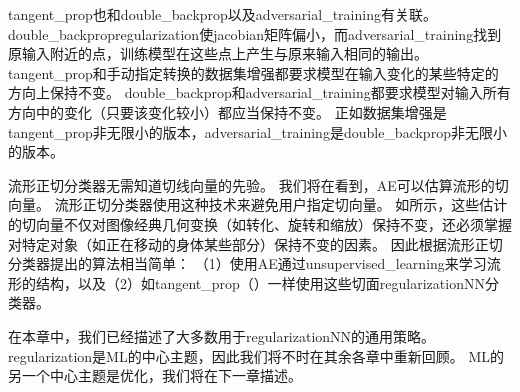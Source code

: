
\gls{tangent_prop}也和\gls{double_backprop}\citep{Drucker-LeCun-1992}以及\gls{adversarial_training}\citep{Szegedy-et-al-2014b,Goodfellow-et-al-2014b}有关联。
\gls{double_backprop}\gls{regularization}使\gls{jacobian}矩阵偏小，而\gls{adversarial_training}找到原输入附近的点，训练模型在这些点上产生与原来输入相同的输出。
\gls{tangent_prop}和手动指定转换的数据集增强都要求模型在输入变化的某些特定的方向上保持不变。
\gls{double_backprop}和\gls{adversarial_training}都要求模型对输入所有方向中的变化（只要该变化较小）都应当保持不变。
正如数据集增强是\gls{tangent_prop}非无限小的版本，\gls{adversarial_training}是\gls{double_backprop}非无限小的版本。

流形正切分类器\citep{Rifai-et-al-2011c}无需知道切线向量的先验。
我们将在看到，\gls{AE}可以估算流形的切向量。
流形正切分类器使用这种技术来避免用户指定切向量。
如所示，这些估计的切向量不仅对图像经典几何变换（如转化、旋转和缩放）保持不变，还必须掌握对特定对象（如正在移动的身体某些部分）保持不变的因素。
因此根据流形正切分类器提出的算法相当简单：
（1）使用\gls{AE}通过\gls{unsupervised_learning}来学习流形的结构，以及（2）如\gls{tangent_prop}（）一样使用这些切面\gls{regularization}\gls{NN}分类器。

在本章中，我们已经描述了大多数用于\gls{regularization}\gls{NN}的通用策略。
\gls{regularization}是\gls{ML}的中心主题，因此我们将不时在其余各章中重新回顾。
\gls{ML}的另一个中心主题是优化，我们将在下一章描述。

